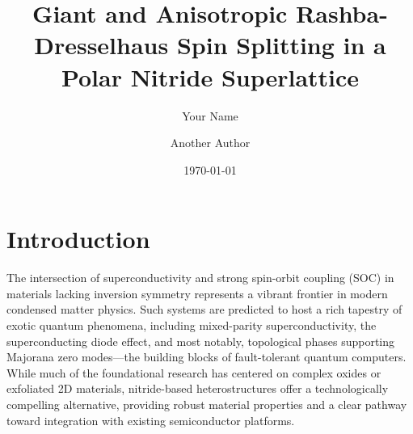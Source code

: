 \documentclass[aps,prl,reprint,superscriptaddress]{revtex4-2}
\begin{document}
\title{ Giant and Anisotropic Rashba-Dresselhaus Spin Splitting in a Polar
Nitride Superlattice}

\author{Your Name}  

\author{Another Author} 

\date{\today}

\maketitle

\section{Introduction}

The intersection of superconductivity and strong spin-orbit coupling (SOC) in
materials lacking inversion symmetry represents a vibrant frontier in modern
condensed matter physics. Such systems are predicted to host a rich tapestry of
exotic quantum phenomena, including mixed-parity superconductivity, the
superconducting diode effect, and most notably, topological phases supporting
Majorana zero modes—the building blocks of fault-tolerant quantum computers.
While much of the foundational research has centered on complex oxides or
exfoliated 2D materials, nitride-based heterostructures offer a technologically
compelling alternative, providing robust material properties and a clear
pathway toward integration with existing semiconductor platforms.  
\end{document}
